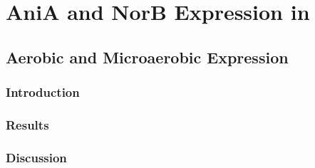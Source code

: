 \chapter{AniA and NorB Expression in \Nm{}}
\section{Aerobic and Microaerobic Expression}
\subsection{Introduction}
\subsection{Results}
\subsection{Discussion}
